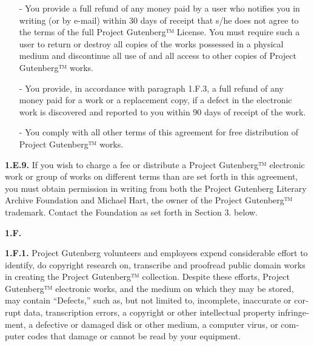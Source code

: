\documentclass[a5paper]{book}
\begin{document}
\begin{german}
\begin{english}
\begin{pgfooter_env}
\begin{itemize}
\item[-] 
You provide a full refund of any money paid by a user who notifies
you in writing (or by e-mail) within 30 days of receipt that s/he
does not agree to the terms of the full Project Gutenberg™
License. You must require such a user to return or destroy all
copies of the works possessed in a physical medium and discontinue
all use of and all access to other copies of Project Gutenberg™
works.\par

\item[-] 
You provide, in accordance with paragraph 1.F.3, a full refund of
any money paid for a work or a replacement copy, if a defect in the
electronic work is discovered and reported to you within 90 days of
receipt of the work.\par

\item[-] 
You comply with all other terms of this agreement for free
distribution of Project Gutenberg™ works.\par
\end{itemize}

{\bfseries{1.E.9.}} If you wish to charge a fee or distribute a Project
Gutenberg™ electronic work or group of works on different terms than
are set forth in this agreement, you must obtain permission in writing
from both the Project Gutenberg Literary Archive Foundation and
Michael Hart, the owner of the Project Gutenberg™ trademark. Contact
the Foundation as set forth in Section 3. below.\par

{\bfseries{1.F.}}\par

{\bfseries{1.F.1.}} Project Gutenberg volunteers and employees expend
considerable effort to identify, do copyright research on, transcribe
and proofread public domain works in creating the Project Gutenberg™
collection. Despite these efforts, Project Gutenberg™ electronic
works, and the medium on which they may be stored, may contain
“Defects,” such as, but not limited to, incomplete, inaccurate or
corrupt data, transcription errors, a copyright or other intellectual
property infringement, a defective or damaged disk or other medium, a
computer virus, or computer codes that damage or cannot be read by
your equipment.\par


\end{pgfooter_env}
\end{english}
\end{german}
\end{document}
